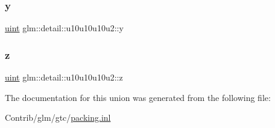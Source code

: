 \subsubsection{\texorpdfstring{y}{y}}
{\footnotesize\ttfamily \mbox{\hyperlink{group__core__precision_ga4fd29415871152bfb5abd588334147c8}{uint}} glm\+::detail\+::u10u10u10u2\+::y}

\mbox{\label{unionglm_1_1detail_1_1u10u10u10u2_a8c4c851343129c55d86d6b0b7aed9b4f}} 
\subsubsection{\texorpdfstring{z}{z}}
{\footnotesize\ttfamily \mbox{\hyperlink{group__core__precision_ga4fd29415871152bfb5abd588334147c8}{uint}} glm\+::detail\+::u10u10u10u2\+::z}



The documentation for this union was generated from the following file\+:\begin{DoxyCompactItemize}
\item 
Contrib/glm/gtc/\mbox{\hyperlink{packing_8inl}{packing.\+inl}}\end{DoxyCompactItemize}
